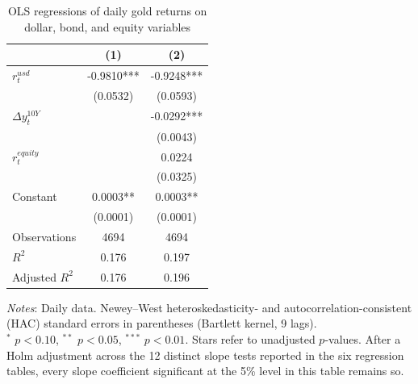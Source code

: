 \begin{table}[H]
\centering
\caption{OLS regressions of daily gold returns on dollar, bond, and equity variables}
\label{tab:ols_gold_dollar}
\begin{tabular}{lcc}
\toprule
 & (1) & (2) \\
\midrule
$r^{usd}_t$ & -0.9810*** & -0.9248*** \\
 & (0.0532) & (0.0593) \\
$\Delta y^{10Y}_t$ &  & -0.0292*** \\
 &  & (0.0043) \\
$r^{equity}_t$ &  & 0.0224 \\
 &  & (0.0325) \\
Constant & 0.0003** & 0.0003** \\
 & (0.0001) & (0.0001) \\
Observations & 4694 & 4694 \\
$R^2$ & 0.176 & 0.197 \\
Adjusted $R^2$ & 0.176 & 0.196 \\
\bottomrule
\end{tabular}

\vspace{0.2cm}
\begin{minipage}{0.9\textwidth}
\footnotesize
\textit{Notes}: Daily data. Newey--West heteroskedasticity- and autocorrelation-consistent (HAC) standard errors in parentheses (Bartlett kernel, 9 lags).\\
$^*$ $p<0.10$, $^{**}$ $p<0.05$, $^{***}$ $p<0.01$. Stars refer to unadjusted $p$-values. After a Holm adjustment across the 12 distinct slope tests reported in the six regression tables, every slope coefficient significant at the 5\% level in this table remains so.
\end{minipage}
\end{table}
